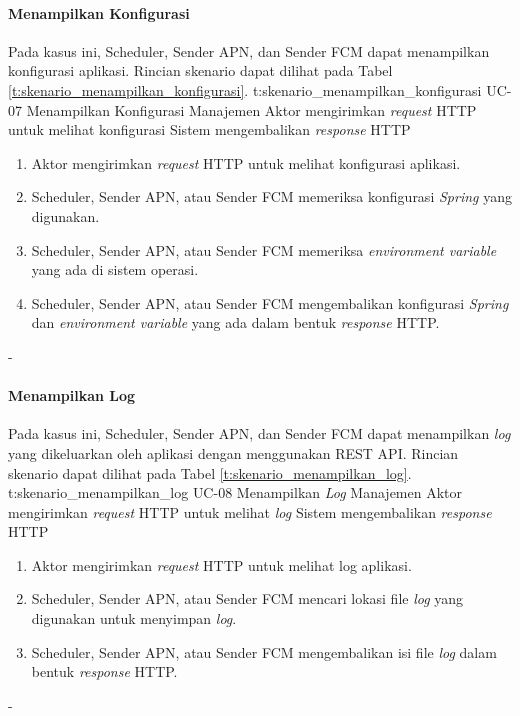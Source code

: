 \paragraph{Menampilkan Konfigurasi}
\par Pada kasus ini, Scheduler, Sender APN, dan Sender FCM dapat menampilkan konfigurasi aplikasi. Rincian skenario dapat dilihat pada Tabel \ref{t:skenario_menampilkan_konfigurasi}.
\tableUcDesc
{t:skenario_menampilkan_konfigurasi}
{UC-07}
{Menampilkan Konfigurasi}
{Manajemen}
{Aktor mengirimkan \textit{request} HTTP untuk melihat konfigurasi}
{Sistem mengembalikan \textit{response} HTTP}
{
	\begin{enumerate}
		\item Aktor mengirimkan \textit{request} HTTP untuk melihat konfigurasi aplikasi.
		\item Scheduler, Sender APN, atau Sender FCM memeriksa konfigurasi \textit{Spring} yang digunakan.
		\item Scheduler, Sender APN, atau Sender FCM memeriksa \textit{environment variable} yang ada di sistem operasi.
		\item Scheduler, Sender APN, atau Sender FCM mengembalikan konfigurasi \textit{Spring} dan \textit{environment variable} yang ada dalam bentuk \textit{response} HTTP.
	\end{enumerate}
}
{-}
\clearpage

\paragraph{Menampilkan Log}
\par Pada kasus ini, Scheduler, Sender APN, dan Sender FCM dapat menampilkan \textit{log} yang dikeluarkan oleh aplikasi dengan menggunakan REST API. Rincian skenario dapat dilihat pada Tabel \ref{t:skenario_menampilkan_log}.
\tableUcDesc
{t:skenario_menampilkan_log}
{UC-08}
{Menampilkan \textit{Log}}
{Manajemen}
{Aktor mengirimkan \textit{request} HTTP untuk melihat \textit{log}}
{Sistem mengembalikan \textit{response} HTTP}
{
\begin{enumerate}
	\item Aktor mengirimkan \textit{request} HTTP untuk melihat log aplikasi.
	\item Scheduler, Sender APN, atau Sender FCM mencari lokasi file \textit{log} yang digunakan untuk menyimpan \textit{log}.
	\item Scheduler, Sender APN, atau Sender FCM mengembalikan isi file \textit{log} dalam bentuk \textit{response} HTTP.
\end{enumerate}
}
{-}
\clearpage

